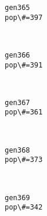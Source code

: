 \documentclass[11pt]{article}
\begin{document}
    \begin{Verbatim}[commandchars=\\\{\}]
gen365
pop\#=397

    \end{Verbatim}

    \begin{center}
    \end{center}
    { \hspace*{\fill} \\}
    
    \begin{Verbatim}[commandchars=\\\{\}]
gen366
pop\#=391

    \end{Verbatim}

    \begin{center}
    \end{center}
    { \hspace*{\fill} \\}
    
    \begin{Verbatim}[commandchars=\\\{\}]
gen367
pop\#=361

    \end{Verbatim}

    \begin{center}
    \end{center}
    { \hspace*{\fill} \\}
    
    \begin{Verbatim}[commandchars=\\\{\}]
gen368
pop\#=373

    \end{Verbatim}

    \begin{center}
    \end{center}
    { \hspace*{\fill} \\}
    
    \begin{Verbatim}[commandchars=\\\{\}]
gen369
pop\#=342

    \end{Verbatim}
\end{document}
